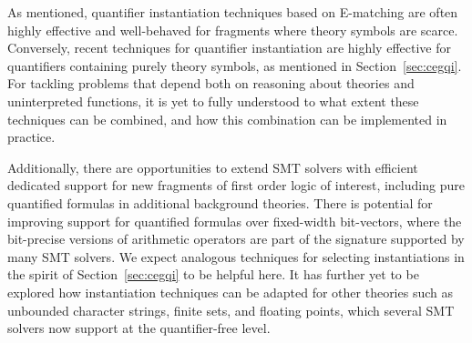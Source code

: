 \documentclass[oribibl]{llncs}
\begin{document}
As mentioned, quantifier instantiation techniques based on E-matching
are often highly effective and well-behaved for fragments where theory symbols are scarce.
Conversely, recent techniques for quantifier instantiation are highly effective for quantifiers containing purely theory symbols,
as mentioned in Section~\ref{sec:cegqi}.
For tackling problems that depend both on reasoning about theories and uninterpreted functions,
it is yet to fully understood to what extent these techniques can be combined,
and how this combination can be implemented in practice.

Additionally, there are opportunities to extend SMT solvers with efficient dedicated support for
new fragments of first order logic of interest, including pure quantified formulas in additional background theories.
There is potential for improving support for quantified formulas over fixed-width bit-vectors,
where the bit-precise versions of arithmetic operators are part of the signature supported by many SMT solvers.
We expect analogous techniques for selecting instantiations in the spirit of Section~\ref{sec:cegqi} to be helpful here.
It has further yet to be explored how instantiation techniques can be adapted
for other theories such as unbounded character strings, finite sets, and floating points, 
which several SMT solvers now support at the quantifier-free level.



\end{document}
